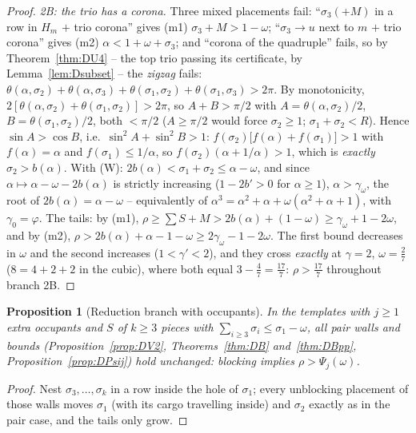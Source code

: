 \documentclass[11pt]{article}
\newtheorem{proposition}[theorem]{Proposition}
\theoremstyle{definition}
\begin{document}
\begin{proof}
\emph{2B: the trio has a corona.} Three mixed placements fail:
``$\sigma_3(+M)$ in a row in $H_m$ $+$ trio corona'' gives (m1)
$\sigma_3+M>1-\omega$; ``$\sigma_3\to u$ next to $m$ $+$ trio corona''
gives (m2) $\alpha<1+\omega+\sigma_3$; and ``corona of the quadruple''
fails, so by Theorem~\ref{thm:DU4} -- the top trio passing its
certificate, by Lemma~\ref{lem:Dsubset} -- the \emph{zigzag} fails:
$\theta(\alpha,\sigma_2)+\theta(\alpha,\sigma_3)
+\theta(\sigma_1,\sigma_2)+\theta(\sigma_1,\sigma_3)>2\pi$. By
monotonicity, $2[\theta(\alpha,\sigma_2)+\theta(\sigma_1,\sigma_2)]>2\pi$,
so $A+B>\pi/2$ with $A=\theta(\alpha,\sigma_2)/2$,
$B=\theta(\sigma_1,\sigma_2)/2$, both $<\pi/2$ ($A\ge\pi/2$ would force
$\sigma_2\ge1$; $\sigma_1+\sigma_2<R$). Hence $\sin A>\cos B$, i.e.\
$\sin^2\!A+\sin^2\!B>1$:
$f(\sigma_2)\bigl[f(\alpha)+f(\sigma_1)\bigr]>1$ with $f(\alpha)=\alpha$
and $f(\sigma_1)\le1/\alpha$, so $f(\sigma_2)(\alpha+1/\alpha)>1$, which
is \emph{exactly} $\sigma_2>b(\alpha)$. With (W):
$2b(\alpha)<\sigma_1+\sigma_2\le\alpha-\omega$, and since
$\alpha\mapsto\alpha-\omega-2b(\alpha)$ is strictly increasing
($1-2b'>0$ for $\alpha\ge1$), $\alpha>\gamma_\omega$, the root of
$2b(\alpha)=\alpha-\omega$ -- equivalently of
$\alpha^3=\alpha^2+\alpha+\omega(\alpha^2+\alpha+1)$, with
$\gamma_0=\varphi$. The tails: by (m1),
$\rho\ge\sum S+M>2b(\alpha)+(1-\omega)\ge\gamma_\omega+1-2\omega$, and by
(m2), $\rho>2b(\alpha)+\alpha-1-\omega\ge2\gamma_\omega-1-2\omega$. The
first bound decreases in $\omega$ and the second increases
($1<\gamma'<2$), and they cross \emph{exactly} at $\gamma=2$,
$\omega=\tfrac27$ ($8=4+2+2$ in the cubic), where both equal
$3-\tfrac47=\tfrac{17}7$: $\rho>\tfrac{17}7$ throughout branch 2B.
\end{proof}

\begin{proposition}[Reduction branch with occupants]\label{prop:DT3j}
In the templates with $j\ge1$ extra occupants and $S$ of $k\ge3$ pieces
with $\sum_{i\ge3}\sigma_i\le\sigma_1-\omega$, all pair walls and bounds
(Proposition~\ref{prop:DV2}, Theorems~\ref{thm:DB} and~\ref{thm:DBpp},
Proposition~\ref{prop:DPsij}) hold unchanged: blocking implies
$\rho>\Psi_j(\omega)$.
\end{proposition}
\begin{proof}
Nest $\sigma_3,\dots,\sigma_k$ in a row inside the hole of $\sigma_1$;
every unblocking placement of those walls moves $\sigma_1$ (with its
cargo travelling inside) and $\sigma_2$ exactly as in the pair case, and
the tails only grow.
\end{proof}
\end{document}
